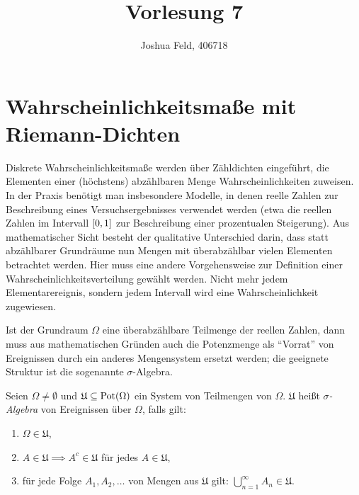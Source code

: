\documentclass{lecture}
\institute{Institut für Statistik und Wirtschaftsmathematik}
\title{Vorlesung 7}
\author{Joshua Feld, 406718}
\begin{document}
    \maketitle


    \section*{Wahrscheinlichkeitsmaße mit Riemann-Dichten}

    Diskrete Wahrscheinlichkeitsmaße werden über Zähldichten eingeführt, die Elementen einer (höchstens) abzählbaren Menge Wahrscheinlichkeiten zuweisen.
    In der Praxis benötigt man insbesondere Modelle, in denen reelle Zahlen zur Beschreibung eines Versuchsergebnisses verwendet werden (etwa die reellen Zahlen im Intervall \(\brackets*{0, 1}\) zur Beschreibung einer prozentualen Steigerung).
    Aus mathematischer Sicht besteht der qualitative Unterschied darin, dass statt abzählbarer Grundräume nun Mengen mit überabzählbar vielen Elementen betrachtet werden.
    Hier muss eine andere Vorgehensweise zur Definition einer Wahrscheinlichkeitsverteilung gewählt werden.
    Nicht mehr jedem Elementarereignis, sondern jedem Intervall wird eine Wahrscheinlichkeit zugewiesen.

    Ist der Grundraum \(\Omega\) eine überabzählbare Teilmenge der reellen Zahlen, dann muss aus mathematischen Gründen auch die Potenzmenge als ``Vorrat'' von Ereignissen durch ein anderes Mengensystem ersetzt werden; die geeignete Struktur ist die sogenannte \(\sigma\)-Algebra.

    \begin{definition}
        Seien \(\Omega \ne \emptyset\) und \(\mathfrak{U} \subseteq \Pot\parentheses*{\Omega}\) ein System von Teilmengen von \(\Omega\).
        \(\mathfrak{U}\) heißt \emph{\(\sigma\)-Algebra} von Ereignissen über \(\Omega\), falls gilt:
        \begin{enumerate}
            \item \(\Omega \in \mathfrak{U}\),
            \item \(A \in \mathfrak{U} \implies A^c \in \mathfrak{U}\) für jedes \(A \in \mathfrak{U}\),
            \item für jede Folge \(A_1, A_2, \ldots\) von Mengen aus \(\mathfrak{U}\) gilt: \(\bigcup_{n = 1}^\infty A_n \in \mathfrak{U}\).
        \end{enumerate}
    \end{definition}
\end{document}

